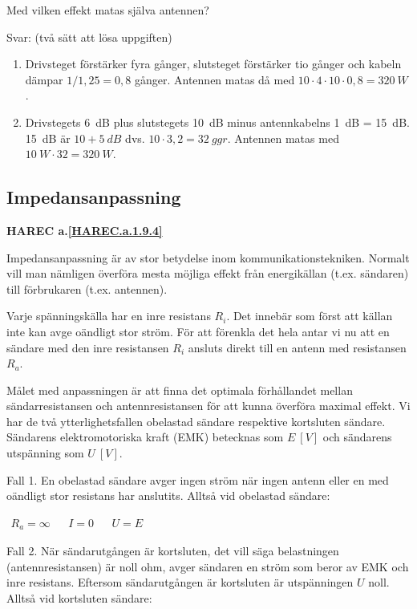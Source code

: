 Med vilken effekt matas själva antennen?

Svar: (två sätt att lösa uppgiften)
\begin{enumerate}
\item Drivsteget förstärker fyra gånger, slutsteget förstärker tio gånger och
kabeln dämpar \(1/1,25 = 0,8\) gånger. Antennen matas då med
\(10 \cdot 4 \cdot 10 \cdot 0,8 = 320\ W\).
\item Drivstegets 6~dB plus slutstegets 10~dB minus antennkabelns 1~dB = 15~dB.
15~dB är \(10 + 5\ dB\) dvs. \(10 \cdot 3,2 = 32\ ggr\). Antennen matas med
\(10\ W \cdot 32 = 320\ W\).
\end{enumerate}

\subsection{Impedansanpassning}
\textbf{HAREC a.\ref{HAREC.a.1.9.4}\label{myHAREC.a.1.9.4}}

Impedansanpassning är av stor betydelse inom kommunikationstekniken.
Normalt vill man nämligen överföra mesta möjliga effekt från energikällan
(t.ex. sändaren) till förbrukaren (t.ex. antennen).

Varje spänningskälla har en inre resistans \(R_i\). Det innebär som först att
källan inte kan avge oändligt stor ström.
För att förenkla det hela antar vi nu att en sändare med den inre resistansen
\(R_i\) ansluts direkt till en antenn med resistansen \(R_a\).

Målet med anpassningen är att finna det optimala förhållandet mellan
sändarresistansen och antennresistansen för att kunna överföra maximal effekt.
Vi har de två ytterlighetsfallen obelastad sändare respektive kortsluten
sändare. Sändarens elektromotoriska kraft (EMK) betecknas som \(E\ [V]\) och
sändarens utspänning som \(U\ [V]\).

Fall 1.
En obelastad sändare avger ingen ström när ingen antenn eller en med oändligt
stor resistans har anslutits.
Alltså vid obelastad sändare:

\(
\begin{array}{lllll}
R_a = \infty & & I = 0 & & U = E
\end{array}
\)

Fall 2.
När sändarutgången är kortsluten, det vill säga belastningen
(antennresistansen) är noll ohm, avger sändaren en ström som beror av EMK och
inre resistans.
Eftersom sändarutgången är kortsluten är utspänningen \(U\) noll.
Alltså vid kortsluten sändare:

